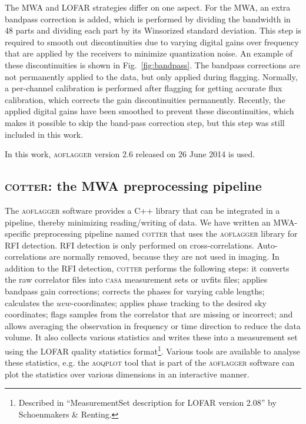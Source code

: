 \documentclass{pasa}
\begin{document}
The MWA and LOFAR strategies differ on one aspect. For the MWA, an extra bandpass correction is added, which is performed by dividing the bandwidth in 48 parts and dividing each part by its Winsorized standard deviation. This step is required to smooth out discontinuities due to varying digital gains over frequency that are applied by the receivers to minimize quantization noise. An example of these discontinuities is shown in Fig.~\ref{fig:bandpass}. The bandpass corrections are not permanently applied to the data, but only applied during flagging. Normally, a per-channel calibration is performed after flagging for getting accurate flux calibration, which corrects the gain discontinuities permanently. Recently, the applied digital gains have been smoothed to prevent these discontinuities, which makes it possible to skip the band-pass correction step, but this step was still included in this work. 

In this work, \textsc{aoflagger} version 2.6 released on 26 June 2014 is used.

\subsection{\textsc{cotter}: the MWA preprocessing pipeline}

The \textsc{aoflagger} software provides a C++ library %
that can be integrated in a pipeline, thereby minimizing reading/writing of data. We have written an MWA-specific preprocessing pipeline named \textsc{cotter} that uses the \textsc{aoflagger} library for RFI detection. RFI detection is only performed on cross-correlations. Auto-correlations are normally removed, because they are not used in imaging. In addition to the RFI detection, \textsc{cotter} performs the following steps: it converts the raw correlator files into \textsc{casa} measurement sets or uvfits files; applies bandpass gain corrections; corrects the phases for varying cable lengths; calculates the $uvw$-coordinates; applies phase tracking to the desired sky coordinates; flags samples from the correlator that are missing or incorrect; and allows averaging the observation in frequency or time direction to reduce the data volume. It also collects various statistics and writes these into a measurement set using the LOFAR quality statistics format\footnote{Described in ``MeasurementSet description for LOFAR version 2.08'' by Schoenmakers \& Renting.}. Various tools are available to analyse these statistics, e.g. the \textsc{aoqplot} tool that is part of the \textsc{aoflagger} software can plot the statistics over various dimensions in an interactive manner.
\end{document}
